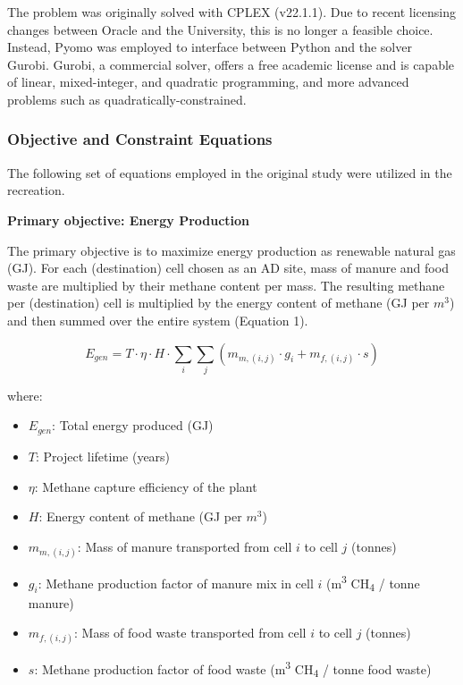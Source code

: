 \documentclass[12pt]{article}
\begin{document}
The problem was originally solved with CPLEX (v22.1.1). Due to recent licensing changes between Oracle and the University, this is no longer a feasible choice. Instead, Pyomo was employed to interface between Python and the solver Gurobi. Gurobi, a commercial solver, offers a free academic license and is capable of linear, mixed-integer, and quadratic programming, and more advanced problems such as quadratically-constrained.

\subsubsection{Objective and Constraint Equations}

The following set of equations employed in the original study were utilized in the recreation.

\vspace{10pt}
\textbf{Primary objective: Energy Production}

The primary objective is to maximize energy production as renewable natural gas (GJ). For each (destination) cell chosen as an AD site, mass of manure and food waste are multiplied by their methane content per mass. The resulting methane per (destination) cell is multiplied by the energy content of methane (GJ per $m^3$) and then summed over the entire system (Equation 1).

\begin{equation}
  E_{gen} = T \cdot \eta \cdot H \cdot \sum_{i}\sum_{j}(m_{m, (i, j)} \cdot g_i + m_{f, (i, j)} \cdot s)
\end{equation}

where:
\begin{itemize}
  \item $E_{gen}$: Total energy produced (GJ)
  \item $T$: Project lifetime (years)
  \item $\eta$: Methane capture efficiency of the plant
  \item $H$: Energy content of methane (GJ per $m^3$)
  \item $m_{m, (i, j)}$: Mass of manure transported from cell $i$ to cell $j$ (tonnes)
  \item $g_i$: Methane production factor of manure mix in cell $i$ (m\textsuperscript{3} CH\textsubscript{4} / tonne manure)
  \item $m_{f, (i, j)}$: Mass of food waste transported from cell $i$ to cell $j$ (tonnes)
  \item $s$: Methane production factor of food waste (m\textsuperscript{3} CH\textsubscript{4} / tonne food waste)
\end{itemize}
\end{document}
